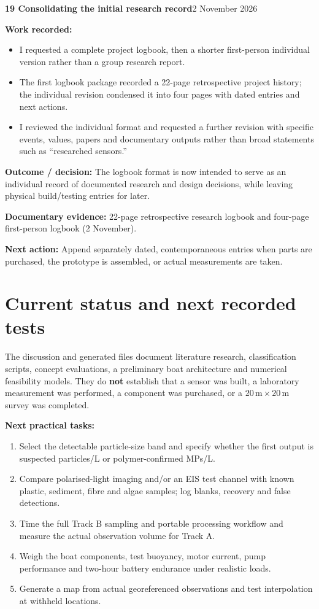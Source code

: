 \documentclass[11pt,a4paper]{article}
\newcommand{\logentry}[3]{%
  \Needspace{13\baselineskip}%
  \vspace{8pt}%
  {\large\bfseries\color{ink}#1 \quad #2}\hfill{\small\color{ink}#3}\par
  \vspace{-3pt}{\color{linecolor}\rule{\linewidth}{.6pt}}\par\vspace{1pt}%
}
\newcommand{\result}[1]{\textbf{Outcome / decision:} #1\par}
\newcommand{\evidence}[1]{\textbf{Documentary evidence:} {\small #1}\par}
\newcommand{\nextstep}[1]{\textbf{Next action:} #1\par}
\begin{document}
\logentry{19}{Consolidating the initial research record}{2 November 2026}
\textbf{Work recorded:}
\begin{itemize}
\item I requested a complete project logbook, then a shorter first-person individual version rather than a group research report.
\item The first logbook package recorded a 22-page retrospective project history; the individual revision condensed it into four pages with dated entries and next actions.
\item I reviewed the individual format and requested a further revision with specific events, values, papers and documentary outputs rather than broad statements such as ``researched sensors.''
\end{itemize}
\result{The logbook format is now intended to serve as an individual record of documented research and design decisions, while leaving physical build/testing entries for later.}
\evidence{22-page retrospective research logbook and four-page first-person logbook (2 November).}
\nextstep{Append separately dated, contemporaneous entries when parts are purchased, the prototype is assembled, or actual measurements are taken.}

\section*{Current status and next recorded tests}
The discussion and generated files document literature research, classification scripts, concept evaluations, a preliminary boat architecture and numerical feasibility models. They do \textbf{not} establish that a sensor was built, a laboratory measurement was performed, a component was purchased, or a $20\,\mathrm{m}\times20\,\mathrm{m}$ survey was completed.

\textbf{Next practical tasks:}
\begin{enumerate}[leftmargin=*,itemsep=2pt,topsep=2pt]
\item Select the detectable particle-size band and specify whether the first output is suspected particles/L or polymer-confirmed MPs/L.
\item Compare polarised-light imaging and/or an EIS test channel with known plastic, sediment, fibre and algae samples; log blanks, recovery and false detections.
\item Time the full Track B sampling and portable processing workflow and measure the actual observation volume for Track A.
\item Weigh the boat components, test buoyancy, motor current, pump performance and two-hour battery endurance under realistic loads.
\item Generate a map from actual georeferenced observations and test interpolation at withheld locations.
\end{enumerate}

\end{document}
